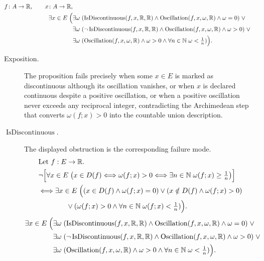 \begin{remark*}
\[
\begin{aligned}
  f\colon A\to\mathbb{R},\qquad
  x\colon A\to\mathbb{R},\\
\exists x\in E\;\Bigl(
&\exists \omega\;(\operatorname{IsDiscontinuous}(f,x,\mathbb{R},\mathbb{R})\land \operatorname{Oscillation}(f,x,\omega,\mathbb{R})\land \omega=0)\;\lor\\
&\exists \omega\;(\neg\operatorname{IsDiscontinuous}(f,x,\mathbb{R},\mathbb{R})\land \operatorname{Oscillation}(f,x,\omega,\mathbb{R})\land \omega>0)\;\lor\\
&\exists \omega\;(\operatorname{Oscillation}(f,x,\omega,\mathbb{R})\land \omega>0\land \forall n\in\mathbb{N}\; \omega<\tfrac1n)
\Bigr).
\end{aligned}
\]
\end{remark*}

\begin{remark*}
\begin{description}
  \item[Exposition.]
The proposition fails precisely when some $x\in E$ is marked as discontinuous although its oscillation vanishes, or when $x$ is declared continuous despite a positive oscillation, or when a positive oscillation never exceeds any reciprocal integer, contradicting the Archimedean step that converts $\omega(f;x)>0$ into the countable union description.


  \item[\(\operatorname{IsDiscontinuous}.\)]
  The displayed obstruction is the corresponding failure mode.
  \[
\begin{aligned}
&\text{Let } f:E\to\mathbb{R}.\\
&\neg\Bigl[\forall x\in E\;\bigl(x\in D(f)\Longleftrightarrow \omega(f;x)>0 \Longleftrightarrow \exists n\in\mathbb{N}\; \omega(f;x)\ge \tfrac1n\bigr)\Bigr]\\
&\Longleftrightarrow \exists x\in E\;\Bigl((x\in D(f)\land \omega(f;x)=0)\lor(x\notin D(f)\land \omega(f;x)>0)\\
&\qquad\qquad\lor(\omega(f;x)>0\land \forall n\in\mathbb{N}\; \omega(f;x)<\tfrac1n)\Bigr).
\end{aligned}
  \]
  \[
\begin{aligned}
\exists x\in E\;\Bigl(
&\exists \omega\;(\operatorname{IsDiscontinuous}(f,x,\mathbb{R},\mathbb{R})\land \operatorname{Oscillation}(f,x,\omega,\mathbb{R})\land \omega=0)\;\lor\\
&\exists \omega\;(\neg\operatorname{IsDiscontinuous}(f,x,\mathbb{R},\mathbb{R})\land \operatorname{Oscillation}(f,x,\omega,\mathbb{R})\land \omega>0)\;\lor\\
&\exists \omega\;(\operatorname{Oscillation}(f,x,\omega,\mathbb{R})\land \omega>0\land \forall n\in\mathbb{N}\; \omega<\tfrac1n)
\Bigr).
\end{aligned}
  \]
\end{description}
\end{remark*}

